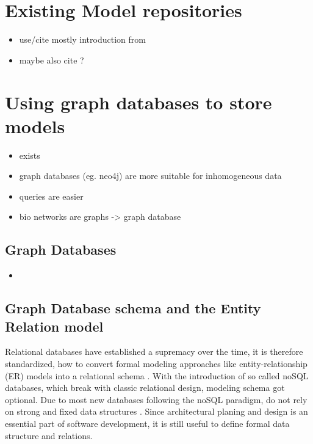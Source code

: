 \section{Existing Model repositories}
\todo{}
\begin{itemize}
	\item use/cite mostly introduction from \cite{Waltemath2013}
	\item maybe also cite \cite{Lysenko2016}?
\end{itemize}

\section{Using graph databases to store \sysbio models}
\label{sec:graph-db}
\begin{itemize}
	\item \masymos exists
	\item graph databases (eg. neo4j) are more suitable for inhomogeneous data
	\item queries are easier
	\item bio networks are graphs -> graph database \cite{Lysenko2016}
\end{itemize}

\subsection{Graph Databases}
\begin{itemize}
	\item {}
\end{itemize}

\subsection{Graph Database schema and the Entity Relation model}
\label{sec:graph-db:er}
Relational databases have established a supremacy over the time, it is therefore standardized, how to convert formal modeling approaches like entity-relationship (ER) models into a relational schema \cite{Saake2010,Teorey1986}. With the introduction of so called noSQL databases, which break with classic relational design, modeling schema got optional. Due to most new databases following the noSQL paradigm, do not rely on strong and fixed data structures \cite{Tudorica2011}.
Since architectural planing and design is an essential part of software development, it is still useful to define formal data structure and relations.

